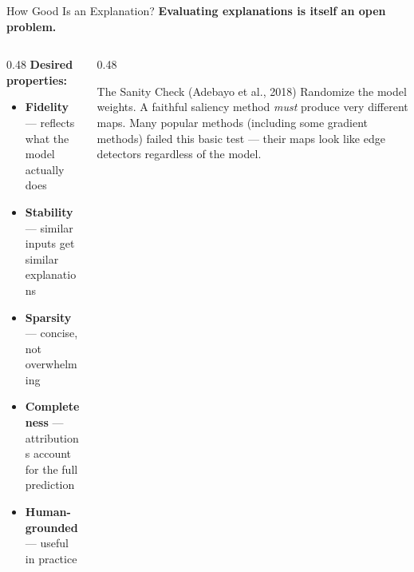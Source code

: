 \documentclass[aspectratio=169]{beamer}
\begin{document}
\begin{frame}{How Good Is an Explanation?}
  \textbf{Evaluating explanations is itself an open problem.}

  \vspace{0.5em}
  \begin{columns}[T]
    \begin{column}{0.48\textwidth}
      \textbf{Desired properties:}
      \begin{itemize}
        \item \textbf{Fidelity} — reflects what the model actually does
        \item \textbf{Stability} — similar inputs get similar explanations
        \item \textbf{Sparsity} — concise, not overwhelming
        \item \textbf{Completeness} — attributions account for the full prediction
        \item \textbf{Human-grounded} — useful in practice
      \end{itemize}
    \end{column}
    \begin{column}{0.48\textwidth}
      \begin{alertblock}{The Sanity Check (Adebayo et al., 2018)}
        Randomize the model weights.
        A faithful saliency method \emph{must} produce very different maps.
        Many popular methods (including some gradient methods) failed
        this basic test — their maps look like edge detectors regardless
        of the model.
      \end{alertblock}
    \end{column}
  \end{columns}
\end{frame}
\end{document}
